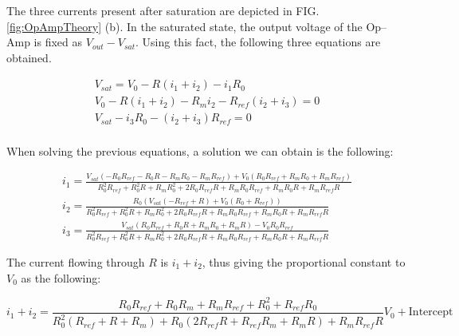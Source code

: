 \documentclass[%
 aip,
amsmath,amssymb,
reprint,
]{revtex4-1}
\begin{document}
The three currents present after saturation are depicted in FIG.\ref{fig:OpAmpTheory} (b). In the saturated state, the output voltage of the Op--Amp is fixed as $V_{out}-V_{sat}$. Using this fact, the following three equations are obtained.

\begin{eqnarray}
  V_{sat} = V_0-R(i_1+i_2)-i_1R_0\\
  V_0 - R(i_1+i_2)-R_mi_2-R_{ref}(i_2+i_3) = 0\\
  V_{sat} -i_3R_0-(i_2+i_3)R_{ref} = 0\\
\end{eqnarray}

When solving the previous equations, a solution we can obtain is the following:
\begin{widetext}
\begin{eqnarray}
  i_1 = \frac{V_{sat}(-R_0R_{ref}-R_0R-R_mR_0-R_mR_{ref})+V_0(R_0R_{ref}+R_mR_0+R_mR_{ref})}{R_0^2R_{ref}+R_0^2R+R_mR_0^2+2R_0R_{ref}R+R_mR_0R_{ref}+R_mR_0R+R_mR_{ref}R}\\
  i_2 = \frac{R_0(V_{sat}(-R_{ref}+R)+V_0(R_0+R_{ref}))}{R_0^2R_{ref}+R_0^2R+R_mR_0^2+2R_0R_{ref}R+R_mR_0R_{ref}+R_mR_0R+R_mR_{ref}R}\\
  i_3 = \frac{V_{sat}(R_0R_{ref}+R_0R+R_mR_0+R_mR)-V_0R_0R_{ref}}{R_0^2R_{ref}+R_0^2R+R_mR_0^2+2R_0R_{ref}R+R_mR_0R_{ref}+R_mR_0R+R_mR_{ref}R}
\end{eqnarray}
\end{widetext}
The current flowing through $R$ is $i_1+i_2$, thus giving the proportional constant to $V_0$ as the following:
\begin{widetext}
\begin{equation}
  i_1+i_2 = \frac{R_0R_{ref}+R_0R_m+R_mR_{ref}+R_0^2+R_{ref}R_0}{R_0^2(R_{ref}+R+R_m)+R_0(2R_{ref}R+R_{ref}R_m+R_mR)+R_mR_{ref}R}V_0 + \text{Intercept}
\end{equation}
\end{widetext}



\end{document}
